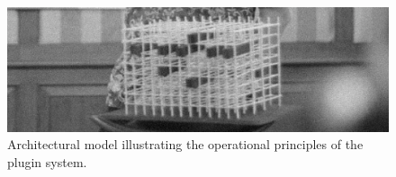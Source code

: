 ﻿%
\begin{figure}[H]
	\centering
	\includegraphics[width=\linewidth]{src/graphics/container-village--physical-model.jpg}
	\caption*{%
		Architectural model illustrating the operational principles of the plugin system.
	}%
	\label{%
		fig:container-village--physical-model
	}%
	\vspace{0pt}%
\end{figure}%
